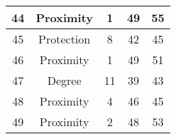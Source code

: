 \documentclass[results.tex]{subfiles}
\begin{document}
\begin{center}
\begin{tabular}{| c || c | c | c | c |}
            \hline
            44                      & Proximity                    & 1                      & 49                      & 55                   \\
            \hline
            45                      & Protection                   & 8                      & 42                      & 45                   \\
            \hline
            46                      & Proximity                    & 1                      & 49                      & 51                   \\
            \hline
            47                      & Degree                       & 11                     & 39                      & 43                   \\
            \hline
            48                      & Proximity                    & 4                      & 46                      & 45                   \\
            \hline
            49                      & Proximity                    & 2                      & 48                      & 53                   \\
            \hline
        \end{tabular}
    \end{center}
\end{document}
